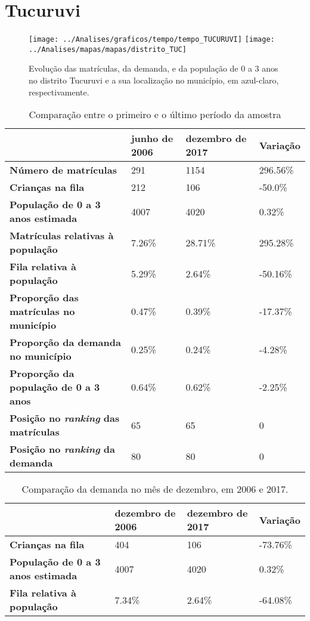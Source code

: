 \section{Tucuruvi}
\begin{figure}[H]
\centering
\texttt{[image: ../Analises/graficos/tempo/tempo\_TUCURUVI]}
\texttt{[image: ../Analises/mapas/mapas/distrito\_TUC]}
\caption{Evolução das matrículas, da demanda, e da população de 0 a 3 anos no distrito Tucuruvi e a sua localização no município, em azul-claro, respectivamente.}
\end{figure}
\begin{table}[H]
\begin{tabular}{l|l|l|l}
\textbf{}                                      & \textbf{junho de 2006}       & \textbf{dezembro de 2017}    & \textbf{Variação} \\ \hline
\textbf{Número de matrículas}                  & 291 & 1154 & 296.56\% \\ \hline
\textbf{Crianças na fila}                      & 212 & 106 & -50.0\% \\ \hline
\textbf{População de 0 a 3 anos estimada}      & 4007 & 4020 & 0.32\% \\ \hline
\textbf{Matrículas relativas à população}      & 7.26\% & 28.71\% & 295.28\% \\ \hline
\textbf{Fila relativa à população}             & 5.29\% & 2.64\% & -50.16\% \\ \hline
\textbf{Proporção das matrículas no município} & 0.47\% & 0.39\% & -17.37\% \\ \hline
\textbf{Proporção da demanda no município}     & 0.25\% & 0.24\% & -4.28\% \\ \hline
\textbf{Proporção da população de 0 a 3 anos}  & 0.64\% & 0.62\% & -2.25\% \\ \hline
\textbf{Posição no \textit{ranking} das matrículas}     & 65 & 65 & 0 \\ \hline
\textbf{Posição no \textit{ranking} da demanda}         & 80 & 80 & 0 \\ 
\end{tabular}
\caption{Comparação entre o primeiro e o último período da amostra}
\end{table}
\begin{table}[H]
\begin{tabular}{l|l|l|l}
\textbf{}                                 & \textbf{dezembro de 2006} & \textbf{dezembro de 2017} & \textbf{Variação} \\ \hline
\textbf{Crianças na fila}                      & 404 & 106 & -73.76\% \\ \hline
\textbf{População de 0 a 3 anos estimada}      & 4007 & 4020 & 0.32\% \\ \hline
\textbf{Fila relativa à população}             & 7.34\% & 2.64\% & -64.08\% \\
\end{tabular}
\caption{Comparação da demanda no mês de dezembro, em 2006 e 2017.}
\end{table}
